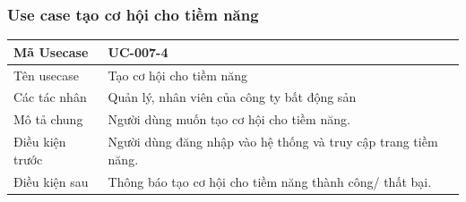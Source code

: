 \documentclass[12pt,a4paper]{article}
\begin{document}
    \subsubsection*{Use case tạo cơ hội cho tiềm năng}
    \begin{table}[H]
        \centering
        \begin{tabular}{|p{3.5cm}|p{11.5cm}|c|}
            \hline
            Mã Usecase      & UC-007-4                                                       \\
            \hline
            Tên usecase     & Tạo cơ hội cho tiềm năng                                       \\
            \hline
            Các tác nhân    & Quản lý, nhân viên của công ty bất động sản                    \\
            \hline
            Mô tả chung     & Người dùng muốn tạo cơ hội cho tiềm năng.                      \\
            \hline

            Điều kiện trước & Người dùng đăng nhập vào hệ thống và truy cập trang tiềm năng. \\
            \hline

            Điều kiện sau   & Thông báo tạo cơ hội cho tiềm năng thành công/ thất bại.       \\
            \hline


\end{tabular}
\end{table}
\end{document}
